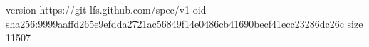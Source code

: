version https://git-lfs.github.com/spec/v1
oid sha256:9999aaffd265e9efdda2721ac56849f14e0486cb41690becf41ecc23286dc26c
size 11507
